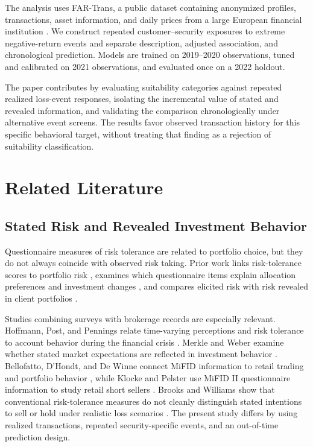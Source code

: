 \documentclass[conference]{IEEEtran}
\begin{document}
The analysis uses FAR-Trans, a public dataset containing anonymized profiles, transactions, asset information, and daily prices from a large European financial institution \cite{sanzcruzado2024fartrans}. We construct repeated customer--security exposures to extreme negative-return events and separate description, adjusted association, and chronological prediction. Models are trained on 2019--2020 observations, tuned and calibrated on 2021 observations, and evaluated once on a 2022 holdout.

The paper contributes by evaluating suitability categories against repeated realized loss-event responses, isolating the incremental value of stated and revealed information, and validating the comparison chronologically under alternative event screens. The results favor observed transaction history for this specific behavioral target, without treating that finding as a rejection of suitability classification.

\section{Related Literature}
\subsection{Stated Risk and Revealed Investment Behavior}
Questionnaire measures of risk tolerance are related to portfolio choice, but they do not always coincide with observed risk taking. Prior work links risk-tolerance scores to portfolio risk \cite{corter2006risk}, examines which questionnaire items explain allocation preferences and investment changes \cite{guillemette2012questions}, and compares elicited risk with risk revealed in client portfolios \cite{thompson2022gap}.

Studies combining surveys with brokerage records are especially relevant. Hoffmann, Post, and Pennings relate time-varying perceptions and risk tolerance to account behavior during the financial crisis \cite{hoffmann2013perceptions,hoffmann2015trading}. Merkle and Weber examine whether stated market expectations are reflected in investment behavior \cite{merkle2014money}. Bellofatto, D'Hondt, and De Winne connect MiFID information to retail trading and portfolio behavior \cite{bellofatto2018literacy}, while Klocke and Pelster use MiFID II questionnaire information to study retail short sellers \cite{klocke2026short}. Brooks and Williams show that conventional risk-tolerance measures do not cleanly distinguish stated intentions to sell or hold under realistic loss scenarios \cite{brooks2022crunch}. The present study differs by using realized transactions, repeated security-specific events, and an out-of-time prediction design.
\end{document}
